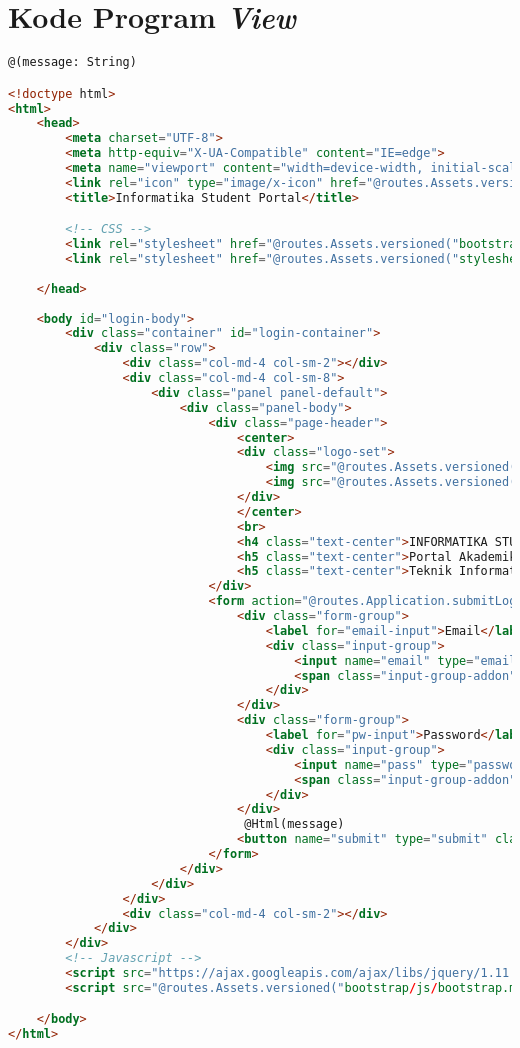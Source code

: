 \chapter{Kode Program \textit{View}}

\singlespacing 
\begin{lstlisting}[language=html,basicstyle=\tiny,caption=login.scala.html]
 @(message: String)

<!doctype html>
<html>
	<head>
		<meta charset="UTF-8">
		<meta http-equiv="X-UA-Compatible" content="IE=edge">
        <meta name="viewport" content="width=device-width, initial-scale=1">
        <link rel="icon" type="image/x-icon" href="@routes.Assets.versioned("images/logo-IT.png")" />
		<title>Informatika Student Portal</title>

		<!-- CSS -->
        <link rel="stylesheet" href="@routes.Assets.versioned("bootstrap/css/bootstrap.min.css")">
        <link rel="stylesheet" href="@routes.Assets.versioned("stylesheets/main.css")">
        
	</head>
	
	<body id="login-body">
	    <div class="container" id="login-container">
			<div class="row">
				<div class="col-md-4 col-sm-2"></div>
				<div class="col-md-4 col-sm-8">
					<div class="panel panel-default">
						<div class="panel-body">
							<div class="page-header">
								<center>
								<div class="logo-set">	
									<img src="@routes.Assets.versioned("images/logo-unpar.png")" width="120px" height="120px"/>
									<img src="@routes.Assets.versioned("images/logo-IT.png")" width="120px" height="120px"/>
								</div>
								</center>
								<br>
								<h4 class="text-center">INFORMATIKA STUDENT PORTAL</h4> 
								<h5 class="text-center">Portal Akademik Mahasiswa</h5>
								<h5 class="text-center">Teknik Informatika UNPAR</h5>
							</div>
							<form action="@routes.Application.submitLogin()" method="POST" name ="loginForm">
								<div class="form-group">
									<label for="email-input">Email</label> 
									<div class="input-group">
										<input name="email" type="email" class="form-control" id="email-input" placeholder="co: 7312012&#64;student.unpar.ac.id"/>
										<span class="input-group-addon"><span class="glyphicon glyphicon-user"></span>
									</div>
								</div>
								<div class="form-group">
									<label for="pw-input">Password</label> 
									<div class="input-group">
										<input name="pass" type="password" class="form-control" id="pw-input" placeholder="********"/>
										<span class="input-group-addon"><span class="glyphicon glyphicon-lock"></span>
									</div>
								</div>
								 @Html(message)
								<button name="submit" type="submit" class="form-control">Login <span class="glyphicon glyphicon-log-in"></span></button>
							</form>
						</div>	
					</div>										
				</div>
				<div class="col-md-4 col-sm-2"></div>
			</div>
		</div>
		<!-- Javascript -->
		<script src="https://ajax.googleapis.com/ajax/libs/jquery/1.11.3/jquery.min.js"></script>
		<script src="@routes.Assets.versioned("bootstrap/js/bootstrap.min.js")></script>

	</body>
</html>
\end{lstlisting}

